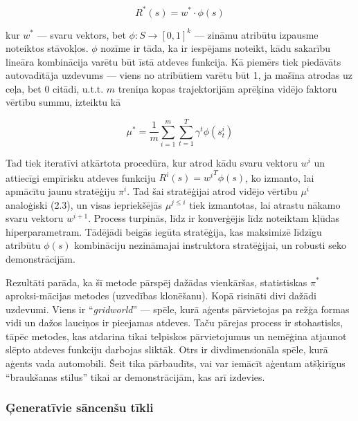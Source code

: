 \documentclass[12pt, a4paper]{article}
\numberwithin{equation}{section} %
\begin{document}
\begin{equation}
    R^*(s) = w^* \cdot \phi(s)
\end{equation}

kur $w^*$ --- svaru vektors, bet $\phi: S \rightarrow [0,1]^k$ --- zināmu atribūtu izpausme noteiktos stāvokļos. $\phi$ nozīme ir tāda, ka ir iespējams noteikt, kādu sakarību lineāra kombinācija varētu būt īstā atdeves funkcija. Kā piemērs tiek piedāvāts autovadītāja uzdevums --- viens no atribūtiem varētu būt 1, ja mašīna atrodas uz ceļa, bet 0 citādi, u.t.t. $m$ treniņa kopas trajektorijām aprēķina vidējo faktoru vērtību summu, izteiktu kā

\begin{equation}
    \mu^* = \frac{1}{m}\sum_{i=1}^m\sum_{t=1}^T \gamma^t \phi(s^i_t)
\end{equation}

Tad tiek iteratīvi atkārtota procedūra, kur atrod kādu svaru vektoru $w^{i}$ un attiecīgi empīrisku atdeves funkciju $R^{i}(s) = {w^{i}}^T\phi(s)$, ko izmanto, lai apmācītu jaunu stratēģiju $\pi^i$. Tad šai stratēģijai atrod vidējo vērtību $\mu^i$ analoģiski (2.3), un visas iepriekšējās $\mu^{j \leq i}$ tiek izmantotas, lai atrastu nākamo svaru vektoru $w^{i+1}$. Process turpinās, līdz ir konverģējis līdz noteiktam kļūdas hiperparametram. Tādējādi beigās iegūta stratēģija, kas maksimizē līdzīgu atribūtu $\phi(s)$ kombināciju nezināmajai instruktora stratēģijai, un robusti seko demonstrācijām.

Rezultāti parāda, ka šī metode pārspēj dažādas vienkāršas, statistiskas $\pi^*$ aproksi-mācijas metodes (uzvedības klonēšanu). Kopā risināti divi dažādi uzdevumi. Viens ir ``\textit{gridworld}'' --- spēle, kurā aģents pārvietojas pa režģa formas vidi un dažos lauciņos ir pieejamas atdeves. Taču pārejas process ir stohastisks, tāpēc metodes, kas atdarina tikai telpiskos pārvietojumus un nemēģina atjaunot slēpto atdeves funkciju darbojas sliktāk. Otrs ir divdimensionāla spēle, kurā aģents vada automobili. Šeit tika pārbaudīts, vai var iemācīt aģentam atšķirīgus ``braukšanas stilus'' tikai ar demonstrācijām, kas arī izdevies.

\subsubsection{Ģeneratīvie sāncenšu tīkli}
\end{document}
